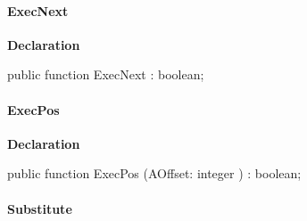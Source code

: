 \documentclass{report}
\newif\ifpdf
\begin{document}
\paragraph*{ExecNext}\hspace*{\fill}

\label{RegExpr.TRegExpr-ExecNext}
\begin{list}{}{
\setlength{\itemindent}{0cm}
\setlength{\listparindent}{0cm}
\setlength{\leftmargin}{\evensidemargin}
\addtolength{\leftmargin}{\tmplength}
\settowidth{\labelsep}{X}
\addtolength{\leftmargin}{\labelsep}
\setlength{\labelwidth}{\tmplength}
}
\item[\textbf{Declaration}\hfill]
\ifpdf
\begin{flushleft}
\fi
\begin{ttfamily}
public function ExecNext : boolean;\end{ttfamily}

\ifpdf
\end{flushleft}
\fi

\end{list}
\paragraph*{ExecPos}\hspace*{\fill}

\label{RegExpr.TRegExpr-ExecPos}
\begin{list}{}{
\setlength{\itemindent}{0cm}
\setlength{\listparindent}{0cm}
\setlength{\leftmargin}{\evensidemargin}
\addtolength{\leftmargin}{\tmplength}
\settowidth{\labelsep}{X}
\addtolength{\leftmargin}{\labelsep}
\setlength{\labelwidth}{\tmplength}
}
\item[\textbf{Declaration}\hfill]
\ifpdf
\begin{flushleft}
\fi
\begin{ttfamily}
public function ExecPos (AOffset: integer ) : boolean;\end{ttfamily}

\ifpdf
\end{flushleft}
\fi

\end{list}
\paragraph*{Substitute}\hspace*{\fill}
\end{document}
